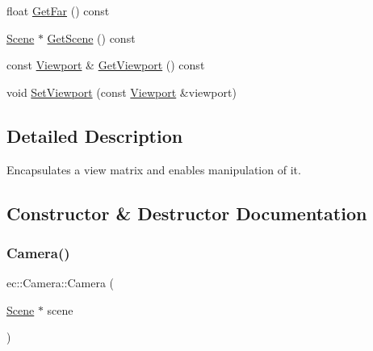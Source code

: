 \begin{DoxyCompactItemize}
\item 
float \mbox{\hyperlink{classec_1_1_camera_a5bdbf9c5001e666bed13a5c75fd1c88f}{Get\+Far}} () const
\item 
\mbox{\hyperlink{classec_1_1_scene}{Scene}} $\ast$ \mbox{\hyperlink{classec_1_1_camera_a77f8c613ff916b697bdab94d4a610e5d}{Get\+Scene}} () const
\item 
const \mbox{\hyperlink{classec_1_1_viewport}{Viewport}} \& \mbox{\hyperlink{classec_1_1_camera_a6997f9c09e6cf43b1e7440eb2af83eb2}{Get\+Viewport}} () const
\item 
void \mbox{\hyperlink{classec_1_1_camera_a30dab960758a3614624cada979abdd5a}{Set\+Viewport}} (const \mbox{\hyperlink{classec_1_1_viewport}{Viewport}} \&viewport)
\end{DoxyCompactItemize}


\subsection{Detailed Description}
Encapsulates a view matrix and enables manipulation of it. 

\subsection{Constructor \& Destructor Documentation}
\mbox{\label{classec_1_1_camera_a5b8034c32e082171bdb61033781cdcc3}} 
\subsubsection{\texorpdfstring{Camera()}{Camera()}\hspace{0.1cm}{\footnotesize\ttfamily [1/2]}}
{\footnotesize\ttfamily ec\+::\+Camera\+::\+Camera (\begin{DoxyParamCaption}\item[{\mbox{\hyperlink{classec_1_1_scene}{Scene}} $\ast$}]{scene }\end{DoxyParamCaption})\hspace{0.3cm}{\ttfamily [explicit]}}

\mbox{\label{classec_1_1_camera_ab5fa55c91ae586754b613c3e8f33b31c}} 

